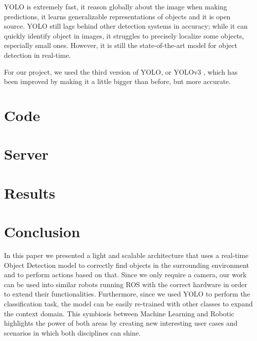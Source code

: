 \documentclass[letterpaper, 10 pt, conference]{ieeeconf}  %
\begin{document}
YOLO is extremely fast, it reason globally about the image when making predictions, it learns generalizable representations of objects and it is open source. YOLO still lags behind other detection systems in accuracy; while it can quickly identify object in images, it struggles to precisely localize some objects, especially small ones. However, it is still the state-of-the-art model for object detection in real-time.

For our project, we used the third version of YOLO, or YOLOv3 \cite{Yolo3}, which has been improved by making it a little bigger than before, but more accurate.

\section{Code}

\section{Server}

\section{Results}

\section{Conclusion}
In this paper we presented a light and scalable architecture that uses a real-time Object Detection model to correctly find objects in the surrounding environment and to perform actions based on that. Since we only require a camera, our work can be used into similar robots running ROS with the correct hardware in order to extend their functionalities. Furthermore, since we used YOLO to perform the classification task, the model can be easily re-trained with other classes to expand the context domain. This symbiosis between Machine Learning and Robotic highlights the power of both areas by creating new interesting user cases and scenarios in which both disciplines can shine.

\printbibliography

%
\end{document}

